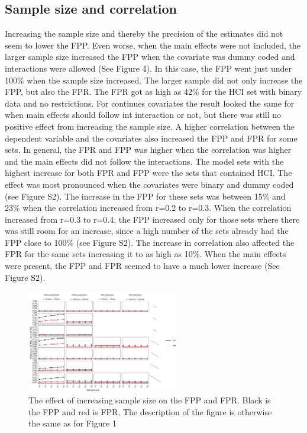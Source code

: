\subsection{Sample size and correlation}
Increasing the sample size and thereby the precision of the estimates did not seem to lower the FPP. Even worse, when the main effects were not included, the larger sample size increased the FPP when the covariate was dummy coded and interactions were allowed (See Figure 4). In this case, the FPP went just under 100\% when the sample size increased. The larger sample did not only increase the FPP, but also the FPR. The FPR got as high as 42\% for the HCI set with binary data and no restrictions. For continues covariates the result looked the same for when main effects should follow int interaction or not, but there was still no positive effect from increasing the sample size. 
A higher correlation between the dependent variable and the covariates also increased the FPP and FPR for some sets. In general, the FPR and FPP was higher when the correlation was higher and the main effects did not follow the interactions. The model sets with the highest increase for both FPR and FPP were the sets that contained HCI. The effect was most pronounced when the covariates were binary and dummy coded (see Figure S2). The increase in the FPP for these sets was between 15\% and 23\% when the correlation increased from r=0.2 to r=0.3. When the correlation increased from r=0.3 to r=0.4, the FPP increased only for those sets where there was still room for an increase, since a high number of the sets already had the FPP close to 100\% (see Figure S2). The increase in correlation also affected the FPR for the same sets increasing it to as high as 10\%. When the main effects were present, the FPP and FPR seemed to have a much lower increase (See Figure S2).

\begin{figure}[t]
\includegraphics[width=0.6\textwidth]{R/Analysis/Result/Figures/Figure1D.jpeg}
\centering
\caption{The effect of increasing sample size on the FPP and FPR. Black is the FPP and red is FPR. The description of the figure is otherwise the same as for Figure 1}
\label{fig:mainfigure}
\end{figure}
